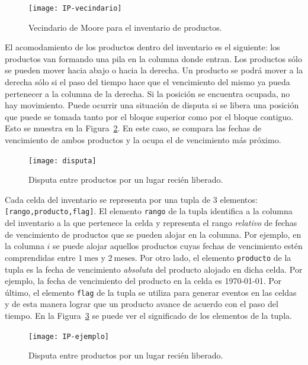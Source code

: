 \documentclass[10pt]{article}
\begin{document}
\begin{figure}[h] 
  \centering 
  \texttt{[image: IP-vecindario]} 
  \caption{Vecindario de Moore para el inventario de productos.} 
  \label{fig:IP-vecindario} 
\end{figure}
\FloatBarrier

El acomodamiento de los productos dentro del inventario es el siguiente: los productos van formando una pila en la columna donde entran. Los productos sólo se pueden mover hacia abajo o hacia la derecha. Un producto se podrá mover a la derecha sólo si el paso del tiempo hace que el vencimiento del mismo ya pueda pertenecer a la columna de la derecha. Si la posición se encuentra ocupada, no hay movimiento.
Puede ocurrir una situación de disputa si se libera una posición que puede se tomada tanto por el bloque superior como por el bloque contiguo. Esto se muestra en la Figura~\ref{fig:IP-disputa}. En este caso, se compara las fechas de vencimiento de ambos productos y la ocupa el de vencimiento más próximo.

\begin{figure}[h] 
	\centering 
	\texttt{[image: disputa]} 
	\caption{Disputa entre productos por un lugar recién liberado.} 
	\label{fig:IP-disputa} 
\end{figure}
\FloatBarrier

Cada celda del inventario se representa por una tupla de 3 elementos: \texttt{[rango,producto,flag]}. El elemento \texttt{rango} de la tupla identifica a la columna del inventario a la que pertenece la celda y representa el rango \textit{relativo} de fechas de vencimiento de productos que se pueden alojar en la columna. Por ejemplo, en la columna $i$ se puede alojar aquellos productos cuyas fechas de vencimiento estén comprendidas entre $1~\textrm{mes}$ y $2~\textrm{meses}$. Por otro lado, el elemento \texttt{producto} de la tupla es la fecha de vencimiento \textit{absoluta} del producto alojado en dicha celda. Por ejemplo, la fecha de vencimiento del producto en la celda es \today. Por último, el elemento \texttt{flag} de la tupla se utiliza para generar eventos en las celdas y de esta manera lograr que un producto avance de acuerdo con el paso del tiempo. En la Figura~\ref{fig:IP-ejemplo} se puede ver el significado de los elementos de la tupla.

\begin{figure}[h] 
	\centering 
	\texttt{[image: IP-ejemplo]} 
	\caption{Disputa entre productos por un lugar recién liberado.} 
	\label{fig:IP-ejemplo} 
\end{figure}
\FloatBarrier
\end{document}
